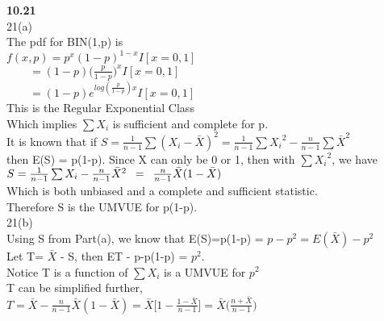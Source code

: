 
{\bf 10.21}\\

{21(a)}\\

The pdf for BIN(1,p) is\\

$f(x,p)=p^{x}(1-p)^{1-x}I[x=0,1]$\\

$\quad \quad = (1-p) \Big( \frac{p}{1-p} \Big) ^{x} I[x=0,1]$\\

$\quad \quad = (1-p) e^{log(\frac{p}{1-p}) x} I[x=0,1]$\\

This is the Regular Exponential Class\\

Which implies $\sum{X_i}$ is sufficient and complete for p.\\

It is known that if $S= \frac{1}{n-1} \sum{(X_i - \bar{X})}^2 = \frac{1}{n-1}\sum{X_i}^2 - \frac{n}{n-1}\sum{\bar{X}}^2$\\

then E(S) = p(1-p). Since X can only be 0 or 1, then with $\sum{X_i}^2$, we have\\

$S=\frac{1}{n-1}\sum{X_i} - \frac{n}{n-1}\bar{X}^2 \enskip = \enskip \frac{n}{n-1} \bar{X}(1-\bar{X})$\\

Which is both unbiased and a complete and sufficient statistic.\\

Therefore S is the UMVUE for p(1-p).\\

{21(b)}\\

Using S from Part(a), we know that E(S)=p(1-p) = $p-p^2 = E(\bar{X}) - p^2$\\

Let T= $\bar{X}$ - S, then ET - p-p(1-p) = $p^2$.\\

Notice T is a function of $\sum{X_i}$ is a UMVUE for $p^2$\\

T can be simplified further,\\

$T=\bar{X} - \frac{n}{n-1}\bar{X}(1-\bar{X}) = \bar{X} \Big[ 1-\frac{1-\bar{X}}{n-1} \Big] = \bar{X} \Big( \frac{n+\bar{X}}{n-1}\Big)$\\

